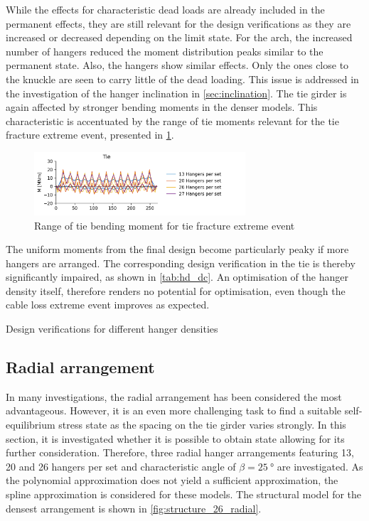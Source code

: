 While the effects for characteristic dead loads are already included in the permanent effects, they are still relevant for the design verifications as they are increased or decreased depending on the limit state. For the arch, the increased number of hangers reduced the moment distribution peaks similar to the permanent state. Also, the hangers show similar effects. Only the ones close to the knuckle are seen to carry little of the dead loading. This issue is addressed in the investigation of the hanger inclination in \cref{sec:inclination}.
The tie girder is again affected by stronger bending moments in the denser models. This characteristic is accentuated by the range of tie moments relevant for the tie fracture extreme event, presented in \cref{fig:hd_tie_fracture}.

\begin{figure}[H]
    \centering
    \includegraphics[trim={0 0 3cm 0},clip, width=0.7\textwidth]{calculations/hanger density/tie fracture_plot.png}
    \caption{Range of tie bending moment for tie fracture extreme event}
    \label{fig:hd_tie_fracture}
\end{figure}

The uniform moments from the final design become particularly peaky if more hangers are arranged. The corresponding design verification in the tie is thereby significantly impaired, as shown in \cref{tab:hd_dc}. An optimisation of the hanger density itself, therefore renders no potential for optimisation, even though the cable loss extreme event improves as expected.

\begin{table}[H]
    \centering
    \caption{Design verifications for different hanger densities}
    \label{tab:hd_dc}
    \resizebox{\columnwidth}{!}{%
    
    }
\end{table}

\subsection{Radial arrangement} \label{sec:density_radial}
In many investigations, the radial arrangement has been considered the most advantageous. However, it is an even more challenging task to find a suitable self-equilibrium stress state as the spacing on the tie girder varies strongly. In this section, it is investigated whether it is possible to obtain state allowing for its further consideration. Therefore, three radial hanger arrangements featuring 13, 20 and 26 hangers per set and characteristic angle of $\beta=\SI{25}{\degree}$ are investigated. 
As the polynomial approximation does not yield a sufficient approximation, the spline approximation is considered for these models. The structural model for the densest arrangement is shown in \cref{fig:structure_26_radial}.

